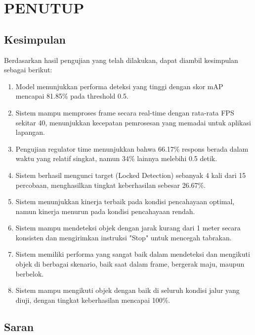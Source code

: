 \chapter{PENUTUP}
\label{chap:penutup}


\section{Kesimpulan}
\label{sec:kesimpulan}

Berdasarkan hasil pengujian yang telah dilakukan, dapat diambil kesimpulan sebagai berikut:

\begin{enumerate}[nolistsep]
  \item Model menunjukkan performa deteksi yang tinggi dengan skor mAP mencapai 81.85\% pada threshold 0.5.
  \item Sistem mampu memproses frame secara real-time dengan rata-rata FPS sekitar 40, menunjukkan kecepatan pemrosesan yang memadai untuk aplikasi lapangan.
  \item Pengujian regulator time menunjukkan bahwa 66.17\% respons berada dalam waktu yang relatif singkat, namun 34\% lainnya melebihi 0.5 detik.
  \item Sistem berhasil mengunci target (Locked Detection) sebanyak 4 kali dari 15 percobaan, menghasilkan tingkat keberhasilan sebesar 26.67\%.
  \item Sistem menunjukkan kinerja terbaik pada kondisi pencahayaan optimal, namun kinerja menurun pada kondisi pencahayaan rendah.
  \item Sistem mampu mendeteksi objek dengan jarak kurang dari 1 meter secara konsisten dan mengirimkan instruksi "Stop" untuk mencegah tabrakan.
  \item Sistem memiliki performa yang sangat baik dalam mendeteksi dan mengikuti objek di berbagai skenario, baik saat dalam frame, bergerak maju, maupun berbelok.
  \item Sistem mampu mengikuti objek dengan baik di seluruh kondisi jalur yang diuji, dengan tingkat keberhasilan mencapai 100\%.

\end{enumerate}

\section{Saran}
\label{chap:saran}

